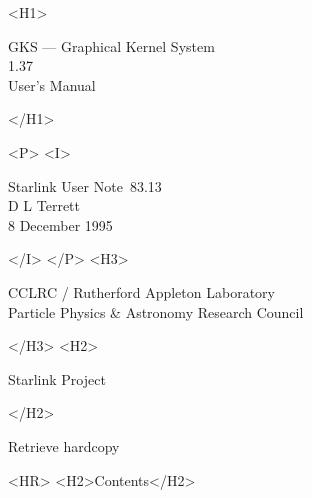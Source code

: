 \documentclass[11pt]{article}
\newcommand{\stardoccategory}  {Starlink User Note}
\newcommand{\stardocsource}    {sun83.13}
\newcommand{\stardocnumber}    {83.13}
\newcommand{\stardocauthors}   {D L Terrett}
\newcommand{\stardocdate}      {8 December 1995}
\newcommand{\stardoctitle}     {GKS --- Graphical Kernel System}
\newcommand{\stardocversion}   {1.37}
\newcommand{\stardocmanual}    {User's Manual}
\newcommand{\htmladdnormallink}[2]{#1}
\newcommand{\htmladdimg}[1]{}
\newcommand{\htmlref}[2]{#1}
\newcommand{\htmladdtonavigation}[1]{}
\newcommand{\xlabel}[1]{}
\newcommand{\latexonlytoc}[0]{\tableofcontents}
\begin{document}
\begin{htmlonly}
   \xlabel{}
   \begin{rawhtml} <H1> \end{rawhtml}
      \stardoctitle\\
      \stardocversion\\
      \stardocmanual
   \begin{rawhtml} </H1> \end{rawhtml}


   \begin{rawhtml} <P> <I> \end{rawhtml}
   \stardoccategory\ \stardocnumber \\
   \stardocauthors \\
   \stardocdate
   \begin{rawhtml} </I> </P> <H3> \end{rawhtml}
      \htmladdnormallink{CCLRC}{http://www.cclrc.ac.uk} /
      \htmladdnormallink{Rutherford Appleton Laboratory}
                        {http://www.cclrc.ac.uk/ral} \\
      \htmladdnormallink{Particle Physics \& Astronomy Research Council}
                        {http://www.pparc.ac.uk} \\
   \begin{rawhtml} </H3> <H2> \end{rawhtml}
      \htmladdnormallink{Starlink Project}{http://star-www.rl.ac.uk/}
   \begin{rawhtml} </H2> \end{rawhtml}
   \htmladdnormallink{\htmladdimg{source.gif} Retrieve hardcopy}
      {http://star-www.rl.ac.uk/cgi-bin/hcserver?\stardocsource}\\

  \label{stardoccontents}
  \begin{rawhtml} 
    <HR>
    <H2>Contents</H2>
  \end{rawhtml}
  \renewcommand{\latexonlytoc}[0]{}
  \htmladdtonavigation{\htmlref{\htmladdimg{contents_motif.gif}}
        {stardoccontents}}

\end{htmlonly}
\end{document}
